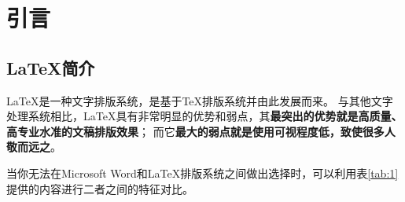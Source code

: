 \section{引言} %

\subsection{{\LaTeX}简介}  %
{\LaTeX}是一种文字排版系统，是基于{\TeX}排版系统并由此发展而来。
与其他文字处理系统相比，{\LaTeX}具有非常明显的优势和弱点，其{\bf 最突出的优势就是高质量、高专业水准的文稿排版效果}；
而它{\bf 最大的弱点就是使用可视程度低，致使很多人敬而远之}\cite{bib:1}。

当你无法在Microsoft Word和{\LaTeX}排版系统之间做出选择时，可以利用表\ref{tab:1} %
提供的内容进行二者之间的特征对比。




